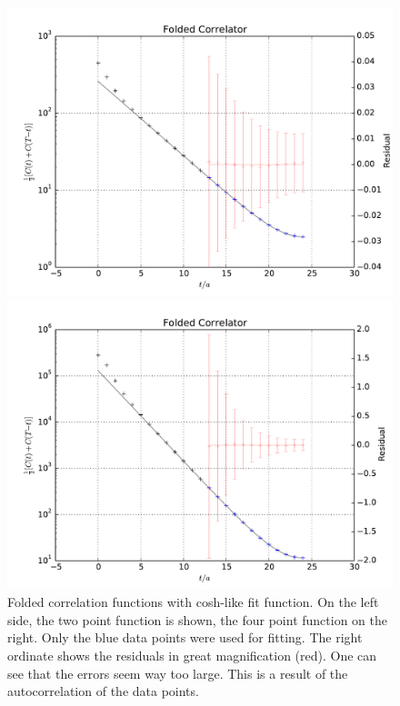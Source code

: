 \documentclass[11pt, english, fleqn, DIV=15, headinclude]{scrartcl}
\begin{document}
\begin{figure}[htbp]
    \centering
    \begin{minipage}[c]{0.49\linewidth}
        \centering
        \includegraphics[width=\linewidth]{plots/A100_24_L24_T48_beta190_mul0100_musig150_mudel190_kappa1632550__ev120__TB2_SO_LI6_new_c2_folded.pdf}
    \end{minipage}
    \hfill
    \begin{minipage}[c]{0.49\linewidth}
        \centering
        \includegraphics[width=\linewidth]{plots/A100_24_L24_T48_beta190_mul0100_musig150_mudel190_kappa1632550__ev120__TB2_SO_LI6_new_c4_folded.pdf}
    \end{minipage}
    \caption{%
        Folded correlation functions with cosh-like fit function. On the left
        side, the two point function is shown, the four point function on the
        right. Only the blue data points were used for fitting. The right
        ordinate shows the residuals in great magnification (red). One can see
        that the errors seem way too large. This is a result of the
        autocorrelation of the data points.
    }
    \label{fig:folded}
\end{figure}
\end{document}
